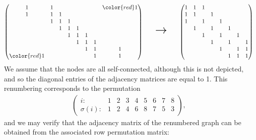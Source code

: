 \[
    \begin{pmatrix}
        1 & 1 &   &   &   &   &   & {\color{red} 1} \\
        1 & 1 & 1 &   &   &   &   &   \\
          & 1 & 1 & 1 &   &   &   &   \\
          &   & 1 & 1 & 1 &   &   &   \\
          &   &   & 1 & 1 & 1 &   &   \\
          &   &   &   & 1 & 1 & 1 &   \\
          &   &   &   &   & 1 & 1 & 1 \\
        {\color{red} 1} &   &   &   &   &   & 1 & 1 \\
    \end{pmatrix}
    \qquad
    \text{\huge$ \rightarrow $}
    \qquad
    \begin{pmatrix}
        1 & 1 & 1 &   &   &   &   &   \\
        1 & 1 &   & 1 &   &   &   &   \\
        1 &   & 1 &   & 1 &   &   &   \\
          & 1 &   & 1 &   & 1 &   &   \\
          &   & 1 &   & 1 &   & 1 &   \\
          &   &   & 1 &   & 1 &   & 1 \\
          &   &   &   & 1 &   & 1 & 1 \\
          &   &   &   &   & 1 & 1 & 1 \\
    \end{pmatrix}
\]
We assume that the nodes are all self-connected,
although this is not depicted,
and so the diagonal entries of the adjacency matrices are equal to 1.
This renumbering corresponds to the permutation
\begin{align*}
    \begin{pmatrix}
        i:         & 1 & 2 & 3 & 4 & 5 & 6 & 7 & 8 \\
        \sigma(i): & 1 & 2 & 4 & 6 & 8 & 7 & 5 & 3
    \end{pmatrix},
\end{align*}
and we may verify that the adjacency matrix of the renumbered graph can be obtained from the associated row permutation matrix:
